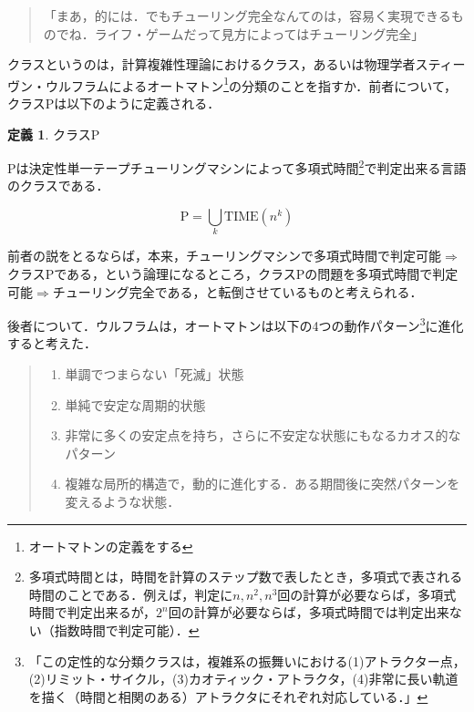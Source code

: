 \documentclass[10pt, a5paper, twoside]{jsarticle}
\theoremstyle{definition}
\newtheorem{dfn}{定義}
\begin{document}
			\begin{quote}

				「まあ，的には．でもチューリング完全なんてのは，容易く実現できるものでね．ライフ・ゲームだって見方によってはチューリング完全」

			\end{quote}

			クラスというのは，計算複雑性理論におけるクラス，あるいは物理学者スティーヴン・ウルフラムによるオートマトン\footnote{オートマトンの定義をする}の分類のことを指すか．前者について，クラスPは以下のように定義される\cite{sip3}．

			\begin{dfn}

				クラスP

				Pは決定性単一テープチューリングマシンによって多項式時間\footnote{多項式時間とは，時間を計算のステップ数で表したとき，多項式で表される時間のことである．例えば，判定に$n, n^2, n^3$回の計算が必要ならば，多項式時間で判定出来るが，$2^n$回の計算が必要ならば，多項式時間では判定出来ない（指数時間で判定可能）．}で判定出来る言語のクラスである．

				$$\mathrm{P} = \bigcup_{k} \mathrm{TIME}(n^k)$$
				
			\end{dfn}

			前者の説をとるならば，本来，チューリングマシンで多項式時間で判定可能$\Rightarrow$クラスPである，という論理になるところ，クラスPの問題を多項式時間で判定可能$\Rightarrow$チューリング完全である，と転倒させているものと考えられる．

			後者について．ウルフラムは，オートマトンは以下の4つの動作パターン\footnote{「この定性的な分類クラスは，複雑系の振舞いにおける(1)アトラクター点，(2)リミット・サイクル，(3)カオティック・アトラクタ，(4)非常に長い軌道を描く（時間と相関のある）アトラクタにそれぞれ対応している．」\cite{bio}}に進化すると考えた\cite{bio}．

			\begin{quote}

				\begin{enumerate}
					\item 単調でつまらない「死滅」状態

					\item 単純で安定な周期的状態

					\item 非常に多くの安定点を持ち，さらに不安定な状態にもなるカオス的なパターン

					\item 複雑な局所的構造で，動的に進化する．ある期間後に突然パターンを変えるような状態．
				\end{enumerate}
				
			\end{quote}
\end{document}

